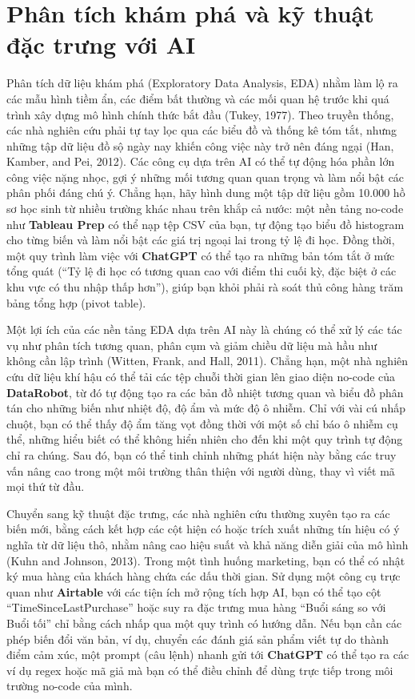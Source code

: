 \section{Phân tích khám phá và kỹ thuật đặc trưng với AI}

Phân tích dữ liệu khám phá (Exploratory Data Analysis, EDA) nhằm làm lộ ra các mẫu hình tiềm ẩn, các điểm bất thường và các mối quan hệ trước khi quá trình xây dựng mô hình chính thức bắt đầu (Tukey, 1977). Theo truyền thống, các nhà nghiên cứu phải tự tay lọc qua các biểu đồ và thống kê tóm tắt, nhưng những tập dữ liệu đồ sộ ngày nay khiến công việc này trở nên đáng ngại (Han, Kamber, and Pei, 2012). Các công cụ dựa trên AI có thể tự động hóa phần lớn công việc nặng nhọc, gợi ý những mối tương quan quan trọng và làm nổi bật các phân phối đáng chú ý. Chẳng hạn, hãy hình dung một tập dữ liệu gồm 10.000 hồ sơ học sinh từ nhiều trường khác nhau trên khắp cả nước: một nền tảng no-code như \textbf{Tableau Prep} có thể nạp tệp CSV của bạn, tự động tạo biểu đồ histogram cho từng biến và làm nổi bật các giá trị ngoại lai trong tỷ lệ đi học. Đồng thời, một quy trình làm việc với \textbf{ChatGPT} có thể tạo ra những bản tóm tắt ở mức tổng quát (``Tỷ lệ đi học có tương quan cao với điểm thi cuối kỳ, đặc biệt ở các khu vực có thu nhập thấp hơn''), giúp bạn khỏi phải rà soát thủ công hàng trăm bảng tổng hợp (pivot table).

Một lợi ích của các nền tảng EDA dựa trên AI này là chúng có thể xử lý các tác vụ như phân tích tương quan, phân cụm và giảm chiều dữ liệu mà hầu như không cần lập trình (Witten, Frank, and Hall, 2011). Chẳng hạn, một nhà nghiên cứu dữ liệu khí hậu có thể tải các tệp chuỗi thời gian lên giao diện no-code của \textbf{DataRobot}, từ đó tự động tạo ra các bản đồ nhiệt tương quan và biểu đồ phân tán cho những biến như nhiệt độ, độ ẩm và mức độ ô nhiễm. Chỉ với vài cú nhấp chuột, bạn có thể thấy độ ẩm tăng vọt đồng thời với một số chỉ báo ô nhiễm cụ thể, những hiểu biết có thể không hiển nhiên cho đến khi một quy trình tự động chỉ ra chúng. Sau đó, bạn có thể tinh chỉnh những phát hiện này bằng các truy vấn nâng cao trong một môi trường thân thiện với người dùng, thay vì viết mã mọi thứ từ đầu.

Chuyển sang kỹ thuật đặc trưng, các nhà nghiên cứu thường xuyên tạo ra các biến mới, bằng cách kết hợp các cột hiện có hoặc trích xuất những tín hiệu có ý nghĩa từ dữ liệu thô, nhằm nâng cao hiệu suất và khả năng diễn giải của mô hình (Kuhn and Johnson, 2013). Trong một tình huống marketing, bạn có thể có nhật ký mua hàng của khách hàng chứa các dấu thời gian. Sử dụng một công cụ trực quan như \textbf{Airtable} với các tiện ích mở rộng tích hợp AI, bạn có thể tạo cột ``TimeSinceLastPurchase'' hoặc suy ra đặc trưng mua hàng ``Buổi sáng so với Buổi tối'' chỉ bằng cách nhấp qua một quy trình có hướng dẫn. Nếu bạn cần các phép biến đổi văn bản, ví dụ, chuyển các đánh giá sản phẩm viết tự do thành điểm cảm xúc, một prompt (câu lệnh) nhanh gửi tới \textbf{ChatGPT} có thể tạo ra các ví dụ regex hoặc mã giả mà bạn có thể điều chỉnh để dùng trực tiếp trong môi trường no-code của mình.

